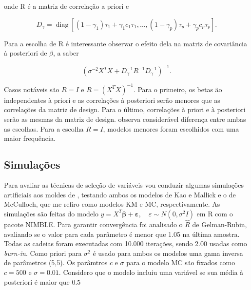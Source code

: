 onde R é a matriz de correlação a priori e 

\begin{equation}\label{eq: Dg}
    D_{\gamma} = \operatorname{diag}[(1-\gamma_1)\tau_1 + \gamma_1 c_1 \tau_1, \dots, (1-\gamma_p)\tau_p + \gamma_p c_p \tau_p].
\end{equation}

Para a escolha de R é interessante observar o efeito dela na matriz de covariância à posteriori de $\beta$, a saber

\begin{equation}\label{eq: posterior_R}
    (\sigma^{-2}X^T X + D_{\gamma}^{-1} R^{-1} D_{\gamma}^{-1})^{-1}.
\end{equation}

Casos notáveis são $R=I$ e $R = (X^T X)^{-1}$. Para o primeiro, os betas ão independentes à priori e as correlações à posteriori serão menores que as correlações da matriz de design. Para o último, correlações à priori e à posteriori serão as mesmas da matriz de design. \cite{McCulloch1993} observa considerável diferença entre ambas as escolhas. Para a escolha $R=I$, modelos menores foram escolhidos com uma maior frequência. 

\subsection{Simulações}

Para avaliar as técnicas de seleção de variáveis vou conduzir algumas simulações artificiais aos moldes de \textcite{VANERP201931}, testando ambos os modelos de Kao e Mallick e o de McCulloch, que me refiro como modelos KM e MC, respectivamente. As simulações são feitas do modelo $y = X^T \boldsymbol{\beta} + \boldsymbol{\varepsilon}, \quad \varepsilon \sim N(0,\sigma^2 I)$ em R com o pacote NIMBLE. Para garantir convergência foi analisado o $\hat{R}$ de Gelman-Rubin, avaliando se o valor para cada parâmetro é menor que 1.05 na última amostra. Todas as cadeias foram executadas com 10.000 iterações, sendo 2.00 usadas como \textit{burn-in}. Como priori para $\sigma^2$ é usado para ambos os modelos uma gama inversa de parâmetros (5,5). Os parâmtros $c$ e $\sigma$ para o modelo MC são fixados como $c = 500$ e $\sigma = 0.01$. Considero que o modelo incluiu uma variável se sua média à posteriori é maior que 0.5


